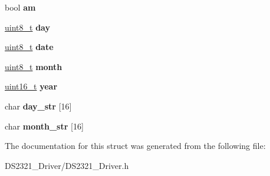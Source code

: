 \begin{DoxyCompactItemize}
\begin{tabbing}
\end{tabbing}\item 
\mbox{\label{structDS2321__Time_ae1900a8be90f9b4af2d2c48a528f924c}} 
bool {\bfseries am}
\item 
\mbox{\label{structDS2321__Time_a9771a605d3ca4b9ff10f97cef39035c8}} 
\hyperlink{vl53l0x__types_8h_aba7bc1797add20fe3efdf37ced1182c5}{uint8\+\_\+t} {\bfseries day}
\item 
\mbox{\label{structDS2321__Time_a1aeaa5d8ade0a961af796c2f069c5dc6}} 
\hyperlink{vl53l0x__types_8h_aba7bc1797add20fe3efdf37ced1182c5}{uint8\+\_\+t} {\bfseries date}
\item 
\mbox{\label{structDS2321__Time_a9dd138fdae805da5120814a0d1fd4d6f}} 
\hyperlink{vl53l0x__types_8h_aba7bc1797add20fe3efdf37ced1182c5}{uint8\+\_\+t} {\bfseries month}
\item 
\mbox{\label{structDS2321__Time_a3e00887dce6436edf0950e4fed1919f0}} 
\hyperlink{vl53l0x__types_8h_a273cf69d639a59973b6019625df33e30}{uint16\+\_\+t} {\bfseries year}
\item 
\mbox{\label{structDS2321__Time_a2ffd985e707057c218b807577f885874}} 
char {\bfseries day\+\_\+str} \mbox{[}16\mbox{]}
\item 
\mbox{\label{structDS2321__Time_a3139ce6945405f54822e6c9c501f11d4}} 
char {\bfseries month\+\_\+str} \mbox{[}16\mbox{]}
\end{DoxyCompactItemize}


The documentation for this struct was generated from the following file\+:\begin{DoxyCompactItemize}
\item 
D\+S2321\+\_\+\+Driver/D\+S2321\+\_\+\+Driver.\+h\end{DoxyCompactItemize}
